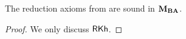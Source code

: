 \medskip 

\begin{lemma}\label{lemma:arrow-kh-valid}
	The reduction axioms from  are sound in $\mathbf{M}_{\mathbf{BA}}$.
\end{lemma}

\begin{proof} We only discuss $\textsf{RKh}$.
	
	
	
	

\end{proof}
